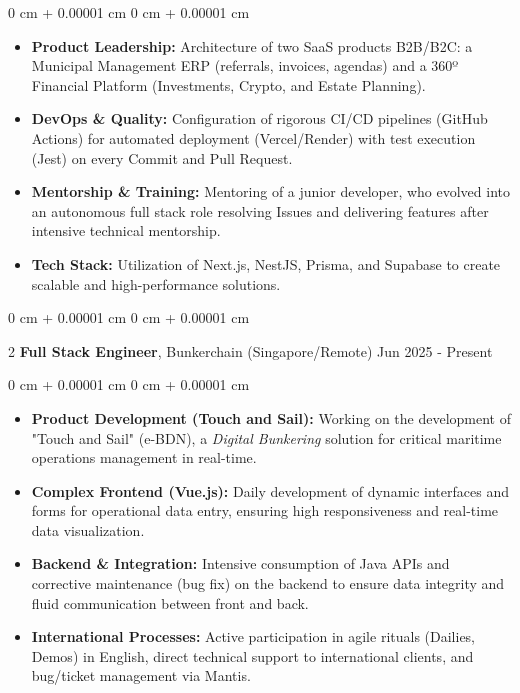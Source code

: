 \documentclass[10pt, letterpaper]{article}
\newenvironment{highlights}{ \begin{itemize}[ topsep=0.10 cm, parsep=0.10 cm, partopsep=0pt,
itemsep=0pt, leftmargin=0 cm + 10pt ] }{ \end{itemize} } %
\newenvironment{onecolentry}{ \begin{adjustwidth}{ 0 cm + 0.00001 cm }{ 0 cm + 0.00001 cm }
}{ \end{adjustwidth} } %
\newenvironment{twocolentry}[2][]{ \onecolentry \def\secondColumn{#2} \setcolumnwidth{\fill, 4.5 cm}
\begin{paracol}{2} }{ \switchcolumn \raggedleft \secondColumn \end{paracol}
\endonecolentry } %
\begin{document}
	\vspace{0.10 cm}
	\begin{onecolentry}
		\begin{highlights}
			\item \textbf{Product Leadership:} Architecture of two SaaS products B2B/B2C: a Municipal Management ERP (referrals, invoices, agendas) and a 360º Financial Platform (Investments, Crypto, and Estate Planning).
            \item \textbf{DevOps \& Quality:} Configuration of rigorous CI/CD pipelines (GitHub Actions) for automated deployment (Vercel/Render) with test execution (Jest) on every Commit and Pull Request.
            \item \textbf{Mentorship \& Training:} Mentoring of a junior developer, who evolved into an autonomous full stack role resolving Issues and delivering features after intensive technical mentorship.
			\item \textbf{Tech Stack:} Utilization of Next.js, NestJS, Prisma, and Supabase to create scalable and high-performance solutions.
		\end{highlights}
	\end{onecolentry}

    \vspace{0.2 cm}

    \begin{twocolentry}
		{ Jun 2025 - Present } \textbf{Full Stack Engineer}, Bunkerchain (Singapore/Remote)
	\end{twocolentry}
	
	\vspace{0.10 cm}
	\begin{onecolentry}
		\begin{highlights}
			\item \textbf{Product Development (Touch and Sail):} Working on the development of "Touch and Sail" (e-BDN), a \textit{Digital Bunkering} solution for critical maritime operations management in real-time.
            \item \textbf{Complex Frontend (Vue.js):} Daily development of dynamic interfaces and forms for operational data entry, ensuring high responsiveness and real-time data visualization.
            \item \textbf{Backend \& Integration:} Intensive consumption of Java APIs and corrective maintenance (bug fix) on the backend to ensure data integrity and fluid communication between front and back.
            \item \textbf{International Processes:} Active participation in agile rituals (Dailies, Demos) in English, direct technical support to international clients, and bug/ticket management via Mantis.
		\end{highlights}
	\end{onecolentry}
	
\end{document}
